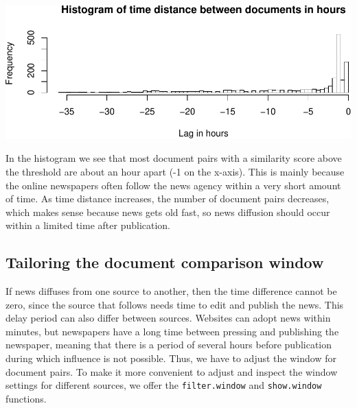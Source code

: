 \documentclass[]{article}
\newenvironment{Shaded}{\begin{snugshade}}{\end{snugshade}}
\newcommand{\KeywordTok}[1]{\textcolor[rgb]{0.13,0.29,0.53}{\textbf{{#1}}}}
\newcommand{\DataTypeTok}[1]{\textcolor[rgb]{0.13,0.29,0.53}{{#1}}}
\newcommand{\DecValTok}[1]{\textcolor[rgb]{0.00,0.00,0.81}{{#1}}}
\newcommand{\StringTok}[1]{\textcolor[rgb]{0.31,0.60,0.02}{{#1}}}
\newcommand{\NormalTok}[1]{{#1}}
\begin{document}
\begin{Shaded}
\end{Shaded}

\includegraphics{vignette_files/figure-latex/unnamed-chunk-11-1.pdf}

In the histogram we see that most document pairs with a similarity score
above the threshold are about an hour apart (-1 on the x-axis). This is
mainly because the online newspapers often follow the news agency within
a very short amount of time. As time distance increases, the number of
document pairs decreases, which makes sense because news gets old fast,
so news diffusion should occur within a limited time after publication.

\subsection{Tailoring the document comparison
window}\label{tailoring-the-document-comparison-window}

If news diffuses from one source to another, then the time difference
cannot be zero, since the source that follows needs time to edit and
publish the news. This delay period can also differ between sources.
Websites can adopt news within minutes, but newspapers have a long time
between pressing and publishing the newspaper, meaning that there is a
period of several hours before publication during which influence is not
possible. Thus, we have to adjust the window for document pairs. To make
it more convenient to adjust and inspect the window settings for
different sources, we offer the \texttt{filter.window} and
\texttt{show.window} functions.
\end{document}
